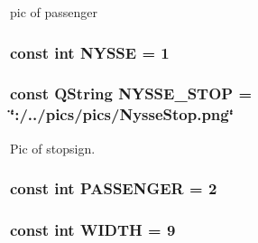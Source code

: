 pic of passenger 

\hypertarget{actoritem_8hh_a184d5b62435541e060c4dd4f179bec92}{
\subsubsection[{N\-Y\-S\-S\-E}]{\setlength{\rightskip}{0pt plus 5cm}const int N\-Y\-S\-S\-E = 1}}\label{actoritem_8hh_a184d5b62435541e060c4dd4f179bec92}
\hypertarget{actoritem_8hh_aa4b129297bf7c3a2ab33895c4ec37ade}{
\subsubsection[{N\-Y\-S\-S\-E\-\_\-\-S\-T\-O\-P}]{\setlength{\rightskip}{0pt plus 5cm}const Q\-String N\-Y\-S\-S\-E\-\_\-\-S\-T\-O\-P = \char`\"{}\-:/../pics/pics/Nysse\-Stop.\-png\char`\"{}}}\label{actoritem_8hh_aa4b129297bf7c3a2ab33895c4ec37ade}


Pic of stopsign. 

\hypertarget{actoritem_8hh_ad93711fcc7685c6b7a6530eda7984a55}{
\subsubsection[{P\-A\-S\-S\-E\-N\-G\-E\-R}]{\setlength{\rightskip}{0pt plus 5cm}const int P\-A\-S\-S\-E\-N\-G\-E\-R = 2}}\label{actoritem_8hh_ad93711fcc7685c6b7a6530eda7984a55}
\hypertarget{actoritem_8hh_a9649ab8139c4c2ea5c93625b30d92a05}{
\subsubsection[{W\-I\-D\-T\-H}]{\setlength{\rightskip}{0pt plus 5cm}const int W\-I\-D\-T\-H = 9}}\label{actoritem_8hh_a9649ab8139c4c2ea5c93625b30d92a05}
